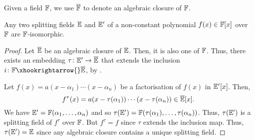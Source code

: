 \begin{defn}
    Given a field $\mathbb{F}$, we use $\overline{\mathbb{F}}$ to denote an algebraic closure of $\mathbb{F}$.
\end{defn}

\begin{theorem} \label{thm:iso-SF}
    Any two splitting fields $\mathbb{E}$ and $\mathbb{E}^{\prime}$ of a non-constant polynomial $f(x) \in \mathbb{F}[x]$ over $\mathbb{F}$ are $\mathbb{F}$-isomorphic.
\end{theorem}
\begin{proof}
    Let $\overline{\mathbb{E}}$ be an algebraic closure of $\mathbb{E}$. Then, it is also one of $\mathbb{F}$. Thus, there exists an embedding $\tau \colon \mathbb{E}^{\prime} \to \overline{\mathbb{E}}$ that extends the inclusion $i \colon \F \xhookrightarrow{} \overline{\E}$, by . 
    
    Let $f(x) = a(x-\alpha_1)\cdots(x-\alpha_n)$ be a factorisation of $f(x)$ in $\mathbb{E}^{\prime}[x]$. Then,
    \[
        f^{\tau}(x) = a(x-\tau(\alpha_1)) \cdots (x-\tau(\alpha_n)) \in \overline{\mathbb{E}}[x].
    \]
    We have $\mathbb{E}^{\prime} = \mathbb{F}(\alpha_1,\ldots,\alpha_n)$ and so $\tau(\mathbb{E}^{\prime}) = \mathbb{F}(\tau(\alpha_1), \ldots, \tau(\alpha_n))$. Thus, $\tau(\mathbb{E}^{\prime})$ is a splitting field of $f^{\tau}$ over $\mathbb{F}$. But $f^{\tau} = f$ since $\tau$ extends the inclusion map. Thus, $\tau(\mathbb{E}^{\prime}) = \mathbb{E}$ since any algebraic closure contains a unique splitting field. 
\end{proof}